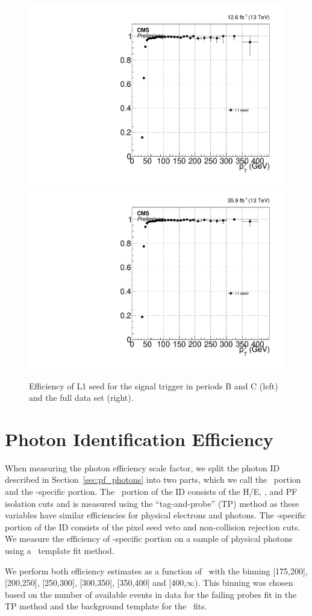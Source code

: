 \begin{figure}[htbp]
  \centering
  \includegraphics[width=0.48\linewidth]{Calibration/Figures/photon_elmuBCD_l1eg40_ptwide.pdf}
  \includegraphics[width=0.48\linewidth]{Calibration/Figures/photon_elmu_l1all_ptwide.pdf}
  \caption{
    Efficiency of L1 seed for the signal trigger in periods B and C (left) and the full data set (right).
  }
  \label{fig:l1_eff}
\end{figure}

\section{Photon Identification Efficiency}
\label{sec:photoneff}

When measuring the photon efficiency scale factor, we split the photon ID described in Section~\ref{sec:pf_photons} into two parts, which we call the \egamma\ portion and the \Pgg-specific portion. 
The \egamma\ portion of the ID consists of the H/E, \sieie, and PF isolation cuts and is measured using the ``tag-and-probe'' (TP) method as these variables have similar efficiencies for physical electrons and photons. 
The \Pgg-specific portion of the ID consists of the pixel seed veto and non-collision rejection cuts.
We measure the efficiency of \Pgg-specific portion on a sample of physical photons using a \sieie\ template fit method.

We perform both efficiency estimates as a function of \pt\ with the binning [175,200], [200,250], [250,300], [300,350], [350,400] and [400,$\infty$). 
This binning was chosen based on the number of available events in data for the failing probes fit in the TP method and the background template for the \sieie\ fits.

